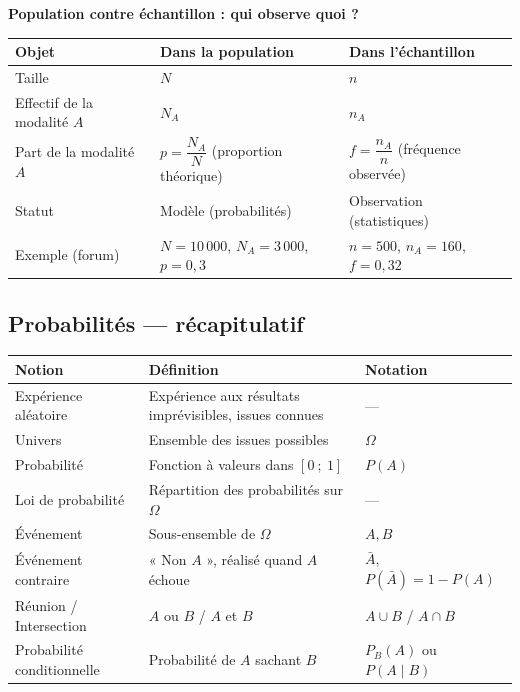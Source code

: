 \documentclass[11pt,a4paper]{article}
\begin{document}
	\begin{center}
		\sffamily\bfseries Population contre échantillon : qui observe quoi ?\\[6pt]
		\begin{tabularx}{0.9\textwidth}{>{\raggedright\arraybackslash}p{4.6cm} >{\raggedright\arraybackslash}X >{\raggedright\arraybackslash}X}
			\toprule
			\textbf{Objet} & \textbf{Dans la population} & \textbf{Dans l'échantillon} \\
			\midrule
			Taille & $N$ & $n$ \\
			Effectif de la modalité $A$ & $N_A$ & $n_A$ \\
			Part de la modalité $A$ &
			$p = \dfrac{N_A}{N}$ (proportion théorique) &
			$f = \dfrac{n_A}{n}$ (fréquence observée) \\
			Statut & Modèle (probabilités) & Observation (statistiques) \\
			Exemple (forum) &
			$N = 10\,000$, $N_A = 3\,000$, $p = 0{,}3$ &
			$n = 500$, $n_A = 160$, $f = 0{,}32$ \\
			\bottomrule
		\end{tabularx}
	\end{center}
	
	\subsection{Probabilités — récapitulatif}
	
	\begin{center}
		\small
		\begin{tabularx}{\textwidth}{>{\raggedright\arraybackslash}p{4.2cm} X >{\raggedright\arraybackslash}p{4.6cm}}
			\toprule
			\textbf{Notion} & \textbf{Définition} & \textbf{Notation} \\
			\midrule
			Expérience aléatoire & Expérience aux résultats imprévisibles, issues connues & — \\
			Univers & Ensemble des issues possibles & $\Omega$ \\
			Probabilité & Fonction à valeurs dans $\left[0\ ;\ 1\right]$ & $P\left(A\right)$ \\
			Loi de probabilité & Répartition des probabilités sur $\Omega$ & — \\
			Événement & Sous-ensemble de $\Omega$ & $A, B$ \\
			Événement contraire & « Non $A$ », réalisé quand $A$ échoue &
			$\bar{A}$, \newline $P\left(\bar{A}\right) = 1 - P\left(A\right)$ \\
			Réunion / Intersection & $A$ ou $B$ / $A$ et $B$ & $A \cup B$ / $A \cap B$ \\
			Probabilité conditionnelle & Probabilité de $A$ sachant $B$ &
			$P_B\left(A\right)$ ou $P\left(A \mid B\right)$ \\
			\bottomrule
		\end{tabularx}
	\end{center}
	
\end{document}
